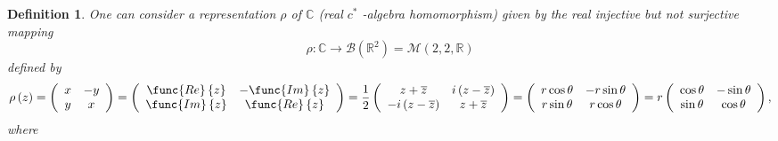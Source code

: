 \documentclass[aps,preprint]{revtex4}
\newtheorem{definition}[theorem]{Definition}
\begin{document}
\begin{definition}
One can consider a representation $\rho $ of $\mathbb{C}$ (real $c^{\ast }$%
-algebra homomorphism) given by the \emph{real} injective but not surjective
mapping 
\begin{equation}
\rho :\mathbb{C}\rightarrow \mathcal{B}\left( \mathbb{R}^{2}\right) =%
\mathcal{M}\left( 2,2,\mathbb{R}\right)
\end{equation}%
defined by 
\begin{equation}
\rho \left( z\right) =\left( 
\begin{array}{cc}
x & -y \\ 
y & x%
\end{array}%
\right) =\left( 
\begin{array}{cc}
\func{Re}\left\{ z\right\} & -\func{Im}\left\{ z\right\} \\ 
\func{Im}\left\{ z\right\} & \func{Re}\left\{ z\right\}%
\end{array}%
\right) =\frac{1}{2}\left( 
\begin{array}{cc}
z+\overline{z} & i\left( z-\overline{z}\right) \\ 
-i\left( z-\overline{z}\right) & z+\overline{z}%
\end{array}%
\right) =\left( 
\begin{array}{cc}
r\cos \theta & -r\sin \theta \\ 
r\sin \theta & r\cos \theta%
\end{array}%
\right) =r\left( 
\begin{array}{cc}
\cos \theta & -\sin \theta \\ 
\sin \theta & \cos \theta%
\end{array}%
\right) ,
\end{equation}%
where
\end{definition}
\end{document}
